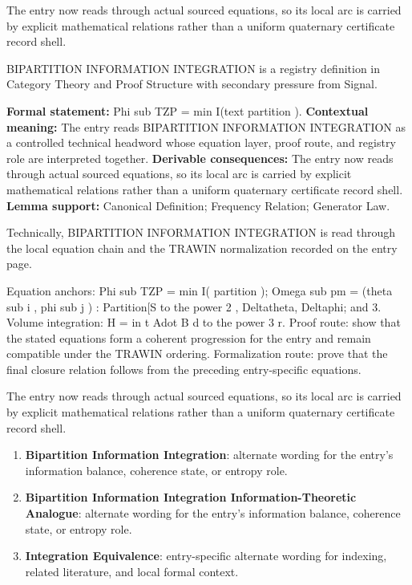 The entry now reads through actual sourced equations, so its local arc is carried by explicit mathematical relations rather than a uniform quaternary certificate record shell.
\clearpage


\begingroup\small
{}
BIPARTITION INFORMATION INTEGRATION is a registry definition in Category Theory and Proof Structure with secondary pressure from Signal.

\begingroup\footnotesize\setlength{\emergencystretch}{3em}\sloppy
\textbf{Formal statement:} Phi sub TZP = min I(text partition ). \textbf{Contextual meaning:} The entry reads BIPARTITION INFORMATION INTEGRATION as a controlled technical headword whose equation layer, proof route, and registry role are interpreted together. \textbf{Derivable consequences:} The entry now reads through actual sourced equations, so its local arc is carried by explicit mathematical relations rather than a uniform quaternary certificate record shell. \textbf{Lemma support:} Canonical Definition; Frequency Relation; Generator Law.\par
\endgroup

Technically, BIPARTITION INFORMATION INTEGRATION is read through the local equation chain and the TRAWIN normalization recorded on the entry page.

Equation anchors: Phi sub TZP = min I( partition ); Omega sub pm = (theta sub i , phi sub j ) : Partition[S to the power 2 , Deltatheta, Deltaphi; and 3. Volume integration: H = in t Adot B d to the power 3 r. Proof route: show that the stated equations form a coherent progression for the entry and remain compatible under the TRAWIN ordering. Formalization route: prove that the final closure relation follows from the preceding entry-specific equations.

The entry now reads through actual sourced equations, so its local arc is carried by explicit mathematical relations rather than a uniform quaternary certificate record shell.
\endgroup

\begin{enumerate}[leftmargin=1.6em,itemsep=6pt,topsep=4pt]
\item \textbf{Bipartition Information Integration}: alternate wording for the entry's information balance, coherence state, or entropy role.
\item \textbf{Bipartition Information Integration Information-Theoretic Analogue}: alternate wording for the entry's information balance, coherence state, or entropy role.
\item \textbf{Integration Equivalence}: entry-specific alternate wording for indexing, related literature, and local formal context.
\end{enumerate}

